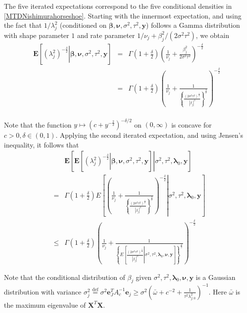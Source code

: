 \documentclass[noinfoline,11pt]{imsart}
\numberwithin{equation}{section}
\theoremstyle{plain}
\newcommand{\y}{\mathbf{y}}
\newcommand{\X}{\mathbf{X}}
\newcommand{\bl}{\boldsymbol{\lambda}}
\newcommand{\E}{\boldsymbol{E}}
\begin{document}
\noindent

The five iterated expectations correspond to the five conditional densities in \eqref{MTDNishimurahorseshoe}. Starting with the innermost expectation, and using the fact that $1/\lambda_j^2$ (conditioned on $\boldsymbol{\beta,\nu},\sigma^2,\tau^2,\mathbf{\y}$) follows a Gamma distribution with shape parameter $1$ and rate parameter $1/\nu_j + \beta_j^2/(2 \sigma^2 \tau^2)$, we obtain 
\begin{eqnarray*}
    \E\left[\left.\left(\lambda_j^2\right)^{-\frac{\delta}{2}}\right|\boldsymbol{\beta,\nu},\sigma^2,\tau^2,\mathbf{\y}\right]&=& \Gamma\left(1+\frac{\delta}{2}\right)\left(\frac{1}{\nu_j}+\frac{\beta_j^2}{2\sigma^2\tau^2}\right)^{-\frac{\delta}{2}} \\
    &=& \Gamma\left(1+\frac{\delta}{2}\right)\left(\frac{1}{\nu_j}+\frac{1}{\left\{\frac{\left(2\sigma^2\tau^2\right)^{\frac{\delta}{2}}}{\left|\beta_j\right|^{\delta}}\right\}^{\frac{2}{\delta}}}\right)^{-\frac{\delta}{2}} \\
\end{eqnarray*}

\noindent
Note that the function $y\mapsto\left(c+y^{-\frac{2}{\delta}}\right)^{-\delta/2}$ on $(0,\infty)$ is concave for $c > 0, \delta \in (0,1)$. Applying the second iterated expectation, and using Jensen's inequality, it follows that
\begin{eqnarray}
&&    \E\left[\left.\E\left[\left.\left(\lambda_j^2\right)^{-\frac{\delta}{2}}\right|\boldsymbol{\beta,\nu},\sigma^2,\tau^2,\mathbf{\y}\right]\right|\sigma^2,\tau^2,\mathbf{\bl}_0,\mathbf{\y}\right]\nonumber \\
     &=& \Gamma\left(1+\frac{\delta}{2}\right)E\left[\left.\left(\frac{1}{\nu_j}+\frac{1}{\left\{\frac{\left(2\sigma^2\tau^2\right)^{\frac{\delta}{2}}}{\left|\beta_j\right|^{\delta}}\right\}^{\frac{2}{\delta}}}\right)^{-\frac{\delta}{2}}\right|\sigma^2,\tau^2,\boldsymbol{\lambda}_0,\mathbf{\y}\right] \nonumber\\
     &\leq& \Gamma\left(1+\frac{\delta}{2}\right)\left(\frac{1}{\nu_j}+\frac{1}{\left\{E\left[\left.\frac{\left(2\sigma^2\tau^2\right)^{\frac{\delta}{2}}}{\left|\beta_j\right|^{\delta}}\right|\sigma^2,\tau^2,\mathbf{\lambda}_0,{\boldsymbol \nu},\mathbf{y}\right]\right\}^{\frac{2}{\delta}}}\right)^{-\frac{\delta}{2}} \label{Nishimurajensen}
     \end{eqnarray}
     
     \noindent
     Note that the conditional distribution of $\beta_j$ given $\sigma^2,\tau^2,\mathbf{\bl}_0,{\boldsymbol \nu},\mathbf{\y}$ is a Gaussian distribution with variance $\sigma_j^2\overset{\text{def}}{=}\sigma^2\boldsymbol{e}_J^TA_c^{-1}\boldsymbol{e}_j\geq \sigma^2\left(\bar{\omega}+c^{-2}+\frac{1}{\tau^2\lambda_{j;0}^2}\right)^{-1}$. 
     Here $\bar{\omega}$ is the maximum eigenvalue of $\X^T\X$. 
\fi      
\end{document}
